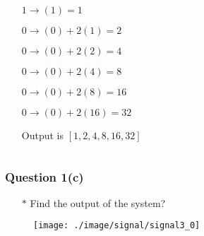 \documentclass{beamer}
\begin{document}
\begin{frame}
\begin{columns}
\begin{column}{6 cm}
\begin{itemize} \itemsep1pt \parskip0pt 
  \item[] \hspace{5 mm}$1 $\hspace{2 mm}$\rightarrow $\hspace{2 mm}$(1) $\hspace{20 mm}$= 1$
  \item[] \hspace{5 mm}$0 $\hspace{2 mm}$\rightarrow $\hspace{2 mm}$(0) + 2(1) $\hspace{8.5 mm}$= 2$
  \item[] \hspace{5 mm}$0 $\hspace{2 mm}$\rightarrow $\hspace{2 mm}$(0) + 2(2) $\hspace{8.5 mm}$= 4$
  \item[] \hspace{5 mm}$0 $\hspace{2 mm}$\rightarrow $\hspace{2 mm}$(0) + 2(4) $\hspace{8.5 mm}$= 8$
  \item[] \hspace{5 mm}$0 $\hspace{2 mm}$\rightarrow $\hspace{2 mm}$(0) + 2(8) $\hspace{8.5 mm}$= 16$
  \item[] \hspace{5 mm}$0 $\hspace{2 mm}$\rightarrow $\hspace{2 mm}$(0) + 2(16) $\hspace{6.5 mm}$= 32$
  \item[] Output is $[1,2,4,8,16,32]$
\end{itemize}
\vspace{2 mm}

\end{column}
\end{columns}
\end{frame}


\begin{frame}
\frametitle{Question 1(c)}

\begin{itemize} \itemsep1pt \parskip0pt 
  \item[$\ast$] Find the output of the system?
\end{itemize}
\vspace{10 mm}


\begin{figure}[H]
  \centering
  \texttt{[image: ./image/signal/signal3\_0]}
\end{figure}
\vspace{10 mm}

\end{frame}
\end{document}
